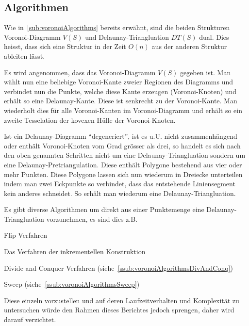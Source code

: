 \subsection{Algorithmen}
\label{sub:delaunayAlgorithms}
Wie in~\ref{sub:voronoiAlgorithms} bereits erwähnt, sind die beiden Strukturen Voronoi-Diagramm $V(S)$ und Delaunay-Triangluation $DT(S)$ dual. Dies heisst, dass sich eine Struktur in der Zeit $O(n)$ aus der anderen Struktur ableiten lässt.

Es wird angenommen, dass das Voronoi-Diagramm $V(S)$ gegeben ist. Man wählt nun eine beliebige Voronoi-Kante zweier Regionen des Diagramms und verbindet nun die Punkte, welche diese Kante erzeugen (Voronoi-Knoten) und erhält so eine Delaunay-Kante. Diese ist senkrecht zu der Voronoi-Kante. Man wiederholt dies für alle Voronoi-Kanten im Voronoi-Diagramm und erhält so ein zweite Tesselation der kovexen Hülle der Voronoi-Knoten.

Ist ein Delaunay-Diagramm ``degeneriert'', ist es u.U. nicht zusammenhängend oder enthält Voronoi-Knoten vom Grad grösser als drei, so handelt es sich nach den oben genannten Schritten nicht um eine Delaunay-Triangluation sondern um eine Delaunay-Pretriangulation. Diese enthält Polygone bestehend aus vier oder mehr Punkten. Diese Polygone lassen sich nun wiederum in Dreiecke unterteilen indem man zwei Eckpunkte so verbindet, dass das entstehende Liniensegment kein anderes schneidet. So erhält man wiederum eine Delaunay-Triangluation.

Es gibt diverse Algorithmen um direkt aus einer Punktemenge eine Delaunay-Triangluation vorzunehmen, es sind dies z.B.

\begin{compactitem}
\item Flip-Verfahren
\item Das Verfahren der inkrementellen Konstruktion
\item Divide-and-Conquer-Verfahren (siehe~\ref{ssub:voronoiAlgorithmsDivAndConq})
\item Sweep (siehe~\ref{ssub:voronoiAlgorithmsSweep})
\end{compactitem}

Diese einzeln vorzustellen und auf deren Laufzeitverhalten und Komplexität zu untersuchen würde den Rahmen dieses Berichtes jedoch sprengen, daher wird darauf verzichtet.
